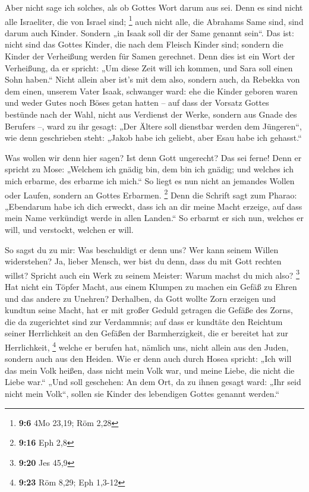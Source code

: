  Aber nicht sage ich solches, als ob Gottes Wort darum aus
sei. Denn es sind nicht alle Israeliter, die von Israel sind;
\footnote{\textbf{9:6} 4Mo 23,19; Röm 2,28}  auch nicht
alle, die Abrahams Same sind, sind darum auch Kinder. Sondern „in Isaak
soll dir der Same genannt sein``.  Das ist: nicht sind das
Gottes Kinder, die nach dem Fleisch Kinder sind; sondern die Kinder der
Verheißung werden für Samen gerechnet.  Denn dies ist ein
Wort der Verheißung, da er spricht: „Um diese Zeit will ich kommen, und
Sara soll einen Sohn haben.``  Nicht allein aber ist's mit
dem also, sondern auch, da Rebekka von dem einen, unserem Vater Isaak,
schwanger ward:  ehe die Kinder geboren waren und weder
Gutes noch Böses getan hatten -- auf dass der Vorsatz Gottes bestünde
nach der Wahl,  nicht aus Verdienst der Werke, sondern aus
Gnade des Berufers --, ward zu ihr gesagt: „Der Ältere soll dienstbar
werden dem Jüngeren``,  wie denn geschrieben steht: „Jakob
habe ich geliebt, aber Esau habe ich gehasst.``

 Was wollen wir denn hier sagen? Ist denn Gott ungerecht?
Das sei ferne!  Denn er spricht zu Mose: „Welchem ich
gnädig bin, dem bin ich gnädig; und welches ich mich erbarme, des
erbarme ich mich.``  So liegt es nun nicht an jemandes
Wollen oder Laufen, sondern an Gottes Erbarmen. \footnote{\textbf{9:16}
  Eph 2,8}  Denn die Schrift sagt zum Pharao: „Ebendarum
habe ich dich erweckt, dass ich an dir meine Macht erzeige, auf dass
mein Name verkündigt werde in allen Landen.``  So erbarmt
er sich nun, welches er will, und verstockt, welchen er will.

 So sagst du zu mir: Was beschuldigt er denn uns? Wer kann
seinem Willen widerstehen?  Ja, lieber Mensch, wer bist du
denn, dass du mit Gott rechten willst? Spricht auch ein Werk zu seinem
Meister: Warum machst du mich also? \footnote{\textbf{9:20} Jes 45,9}
 Hat nicht ein Töpfer Macht, aus einem Klumpen zu machen
ein Gefäß zu Ehren und das andere zu Unehren?  Derhalben,
da Gott wollte Zorn erzeigen und kundtun seine Macht, hat er mit großer
Geduld getragen die Gefäße des Zorns, die da zugerichtet sind zur
Verdammnis;  auf dass er kundtäte den Reichtum seiner
Herrlichkeit an den Gefäßen der Barmherzigkeit, die er bereitet hat zur
Herrlichkeit, \footnote{\textbf{9:23} Röm 8,29; Eph 1,3-12}
 welche er berufen hat, nämlich uns, nicht allein aus den
Juden, sondern auch aus den Heiden.  Wie er denn auch durch
Hosea spricht: „Ich will das mein Volk heißen, dass nicht mein Volk war,
und meine Liebe, die nicht die Liebe war.``  „Und soll
geschehen: An dem Ort, da zu ihnen gesagt ward: „Ihr seid nicht mein
Volk``, sollen sie Kinder des lebendigen Gottes genannt werden.``

